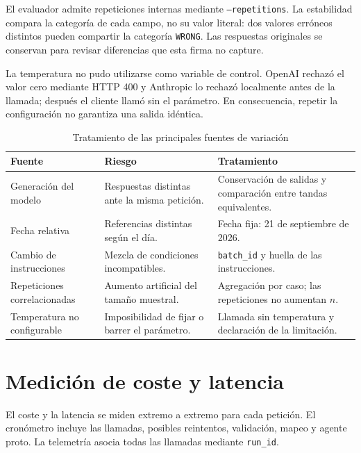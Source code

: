 El evaluador admite repeticiones internas mediante \texttt{--repetitions}. La estabilidad compara la categoría de cada campo, no su valor literal: dos valores erróneos distintos pueden compartir la categoría \texttt{WRONG}. Las respuestas originales se conservan para revisar diferencias que esta firma no capture.

La temperatura no pudo utilizarse como variable de control. OpenAI rechazó el valor cero mediante HTTP 400 y Anthropic lo rechazó localmente antes de la llamada; después el cliente llamó sin el parámetro. En consecuencia, repetir la configuración no garantiza una salida idéntica.

\begin{table}[H]
\centering
\small
\caption{Tratamiento de las principales fuentes de variación}
\label{tab:tratamiento_variabilidad}
\begin{tabular}{|P{3.8cm}|P{4.3cm}|P{5.2cm}|}
\hline
\textbf{Fuente} & \textbf{Riesgo} & \textbf{Tratamiento} \\
\hline
Generación del modelo & Respuestas distintas ante la misma petición. & Conservación de salidas y comparación entre tandas equivalentes. \\
\hline
Fecha relativa & Referencias distintas según el día. & Fecha fija: 21 de septiembre de 2026. \\
\hline
Cambio de instrucciones & Mezcla de condiciones incompatibles. & \texttt{batch\_id} y huella de las instrucciones. \\
\hline
Repeticiones correlacionadas & Aumento artificial del tamaño muestral. & Agregación por caso; las repeticiones no aumentan \(n\). \\
\hline
Temperatura no configurable & Imposibilidad de fijar o barrer el parámetro. & Llamada sin temperatura y declaración de la limitación. \\
\hline
\end{tabular}
\end{table}

\section{Medición de coste y latencia}
\label{sec:coste_latencia}

El coste y la latencia se miden extremo a extremo para cada petición. El cronómetro incluye las llamadas, posibles reintentos, validación, mapeo y agente proto. La telemetría asocia todas las llamadas mediante \texttt{run\_id}.

